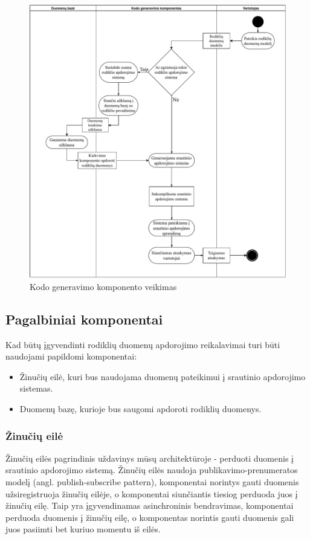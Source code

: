 \documentclass{VUMIFPSbakalaurinis}
\begin{document}
\begin{figure}[H]
    \centering
    \includegraphics[width=1\textwidth]{img/generation-flow.pdf}
    \caption{Kodo generavimo komponento veikimas}
    \label{img:generation-flow}
\end{figure}

\subsection{Pagalbiniai komponentai}
Kad būtų įgyvendinti rodiklių duomenų apdorojimo reikalavimai turi būti naudojami papildomi komponentai:
\begin{itemize}
    \item Žinučių eilė, kuri bus naudojama duomenų pateikimui į srautinio apdorojimo sistemas.
    \item Duomenų bazę, kurioje bus saugomi apdoroti rodiklių duomenys.
\end{itemize}

\subsubsection{Žinučių eilė}

Žinučių eilės pagrindinis uždavinys mūsų architektūroje - perduoti duomenis į srautinio apdorojimo sistemą. Žinučių eilės naudoja publikavimo-prenumeratos modelį (angl. publish-subscribe pattern), komponentai norintys gauti duomenis užsiregistruoja žinučių eilėje, o komponentai siunčiantis tiesiog perduoda juos į žinučių eilę. Taip yra įgyvendinamas asinchroninis bendravimas, komponentai perduoda duomenis į žinučių eilę, o komponentas norintis gauti duomenis gali juos pasiimti bet kuriuo momentu iš eilės.
\end{document}
